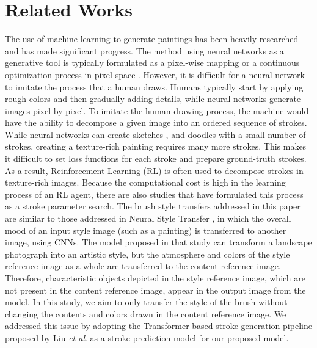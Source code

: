\documentclass{mva_style}
\begin{document}
\section{Related Works}
The use of machine learning to generate paintings has been heavily researched 
and has made significant progress. The method using neural networks as a 
generative tool is typically formulated as a pixel-wise mapping \cite{PerceptualLosses} 
or a continuous optimization process in pixel space \cite{ImageStyleTransfer}.
However, it is difficult for a neural network to imitate the process that a 
human draws. Humans typically start 
by applying rough colors and then gradually adding details, while neural 
networks generate images pixel by pixel. To imitate the human drawing 
process, the machine would have the ability to decompose a given image into 
an ordered sequence of strokes. While neural networks can create sketches 
\cite{DBLP:journals/corr/HaE17}, \cite{DBLP:journals/corr/abs-1805-00247} 
and doodles \cite{DBLP:journals/corr/abs-1810-05977} with a small number of 
strokes, creating a texture-rich painting requires many more strokes.
This makes it difficult to set loss functions for each stroke and prepare 
ground-truth strokes. As a result, Reinforcement Learning (RL) is often used 
to decompose strokes in texture-rich images. \cite{DBLP:journals/corr/abs-1804-01118, DBLP:journals/corr/abs-1206-4634, Huang_2019_ICCV}
Because the computational cost is high in the learning process of an RL agent, 
there are also studies that have formulated this process as a stroke 
parameter search. \cite{PaintTransformer}
The brush style transfers addressed in this paper are similar to those 
addressed in Neural Style Transfer \cite{ImageStyleTransfer}, in which the 
overall mood of an input style image (such as a painting) is transferred to 
another image, using CNNs. The model proposed in that study can transform a 
landscape photograph into an artistic style, but the atmosphere and colors of 
the style reference image as a whole are transferred to the content reference 
image. Therefore, characteristic objects depicted in the style reference 
image, which are not present in the content reference image, appear in the 
output image from the model. 
In this study, we aim to only transfer the style of the brush without changing 
the contents and colors drawn in the content reference image. We addressed 
this issue by adopting the Transformer-based stroke generation pipeline 
proposed by Liu \textit{et al}.\cite{PaintTransformer} as a stroke prediction 
model for our proposed model.
\end{document}
